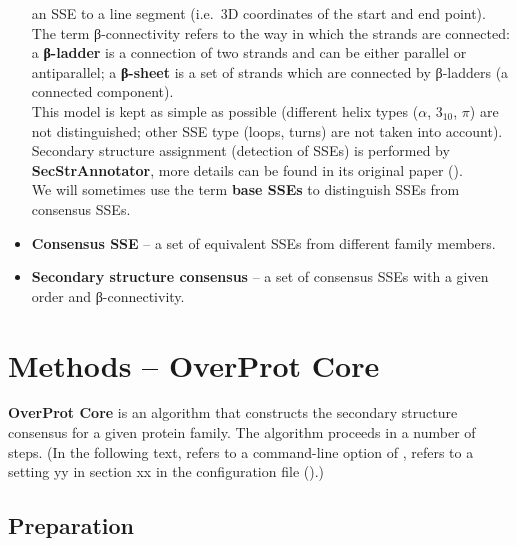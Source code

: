 \documentclass{article}
\begin{document}
\begin{itemize}
    an SSE to a line segment (i.e.~3D coordinates of the start and end
    point).\\
    The term β-connectivity refers to the way in which the strands are
    connected: a \textbf{β-ladder} is a connection of two strands and can
    be either parallel or antiparallel; a \textbf{β-sheet} is a set of
    strands which are connected by β-ladders (a connected component).\\
    This model is kept as simple as possible (different helix types
    (\(\alpha\), \(3_{10}\), \(\pi\)) are not distinguished; other SSE
    type (loops, turns) are not taken into account). Secondary structure
    assignment (detection of SSEs) is performed by
    \textbf{SecStrAnnotator}, more details can be found in its original paper 
    ().\\
    We will sometimes use the term \textbf{base SSEs} to distinguish SSEs from consensus SSEs.
  \item
    \textbf{Consensus SSE} -- a set of equivalent SSEs from different
    family members. 
  \item
    \textbf{Secondary structure consensus} -- a set of consensus SSEs
    with a given order and β-connectivity.
\end{itemize}




\section{Methods -- OverProt Core}

\textbf{OverProt Core} is an algorithm that constructs the secondary
structure consensus for a given protein family. The algorithm proceeds
in a number of steps. 
(In the following text,  refers to a command-line option of ,
 refers to a setting yy in section xx in the configuration file ().)



\subsection{Preparation}
\end{document}

